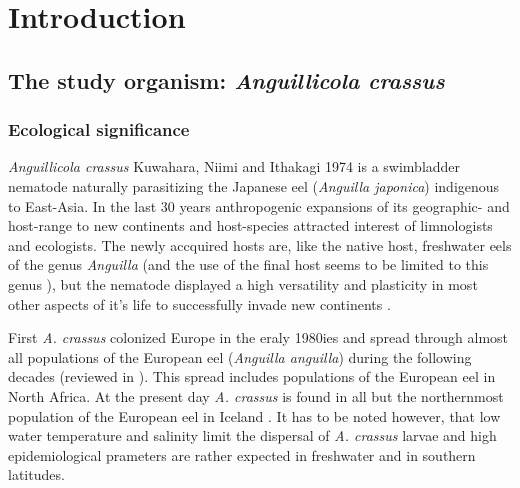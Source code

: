 

\chapter{Introduction}
\label{intro}
\ifpdf
    \graphicspath{{1_introduction/figures/PNG/}{1_introduction/figures/PDF/}{1_introduction/figures/}}
\else
    \graphicspath{{1_introduction/figures/EPS/}{1_introduction/figures/}}
\fi


\section{The study organism: \textit{Anguillicola crassus}} 
\label{stud-org}

\subsection{Ecological significance} 
\label{eco-sig}

\textit{Anguillicola crassus} Kuwahara, Niimi and Ithakagi 1974
\cite{kuwahara_Niimi_Itagaki_1974, moravec_anguillicoloides} is a
swimbladder nematode naturally parasitizing the Japanese eel
(\textit{Anguilla japonica}) indigenous to East-Asia. In the last 30
years anthropogenic expansions of its geographic- and host-range to
new continents and host-species attracted interest of limnologists and
ecologists. The newly accquired hosts are, like the native host,
freshwater eels of the genus \textit{Anguilla} (and the use of the
final host seems to be limited to this genus
\cite{sures_development_1999}), but the nematode displayed a high
versatility and plasticity in most other aspects of it's life to
successfully invade new continents \cite{taraschewski_hosts_2007}.

First \textit{A. crassus} colonized Europe in the eraly 1980ies and
spread through almost all populations of the European eel
(\textit{Anguilla anguilla}) during the following decades (reviewed in
\cite{kirk_impact_2003}). This spread includes populations of the
European eel in North
Africa\cite{gargouri_ben_abdallah_spatio-temporal_2006,
  loukili_dynamics_2007}. At the present day \textit{A. crassus} is
found in all but the northernmost population of the European eel in
Iceland \cite{kristmundsson_parasite_2007}. It has to be noted
however, that low water temperature \cite{knopf_impact_1998} and
salinity \cite{kirk_effect_2000} limit the dispersal of
\textit{A. crassus} larvae and high epidemiological prameters are
rather expected in freshwater and in southern latitudes.

